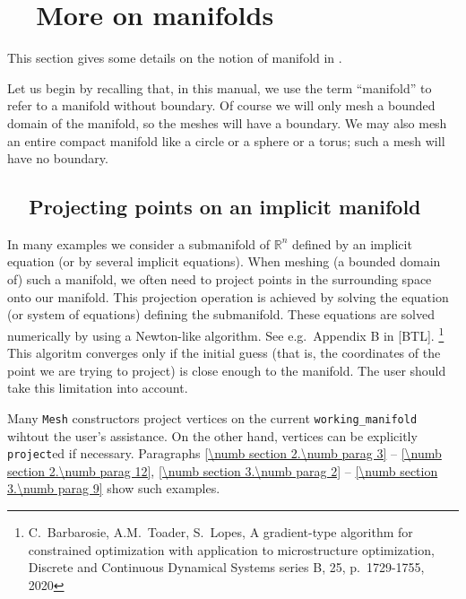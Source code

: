
\chapter{~~More on manifolds}\label{\numb section 8}

This section gives some details on the notion of manifold in \maniFEM.

Let us begin by recalling that, in this manual, we use the term ``manifold'' to refer to
a manifold without boundary.
Of course we will only mesh a bounded domain of the manifold, so the meshes will have a boundary.
We may also mesh an entire compact manifold like a circle or a sphere or a torus;
such a mesh will have no boundary.


\section{~~Projecting points on an implicit manifold}\label{\numb section 8.\numb parag 1}

In many examples we consider a submanifold of $ \mathbb{R}^n $ defined by an implicit equation
(or by several implicit equations).
When meshing (a bounded domain of) such a manifold, we often need to project points in
the surrounding space onto our manifold. This projection operation is achieved by solving
the equation (or system of equations) defining the submanifold.
These equations are solved numerically by using a Newton-like algorithm.
See e.g.\ Appendix B in [BTL].%
\footnote{C.~Barbarosie, A.M.~Toader, S.~Lopes, A gradient-type algorithm for constrained
optimization with application to microstructure optimization, Discrete and Continuous Dynamical
Systems series B, 25, p.\ 1729-1755, 2020}
This algoritm converges only if the initial guess (that is, the coordinates of the point we are
trying to project) is close enough to the manifold.
The user should take this limitation into account.

Many {\small\tt Mesh} constructors project vertices on the current {\small\tt working\_manifold}
wihtout the user's assistance.
On the other hand, vertices can be explicitly {\small\tt project}ed if necessary.
Paragraphs \ref{\numb section 2.\numb parag 3} -- \ref{\numb section 2.\numb parag 12},
\ref{\numb section 3.\numb parag 2} -- \ref{\numb section 3.\numb parag 9} show such examples.
